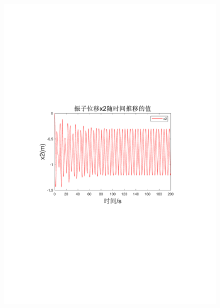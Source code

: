 \documentclass[12pt,utf8]{article}
\begin{document}
\begin{figure}[htbp]
\begin{minipage}{0.45\linewidth}
		\includegraphics[width=0.9\linewidth]{figures/T1-1振子位移x2.pdf}
		\label{chutian3}%
	\end{minipage}
	\begin{minipage}{0.45\linewidth}

\end{minipage}
\end{figure}
\end{document}
